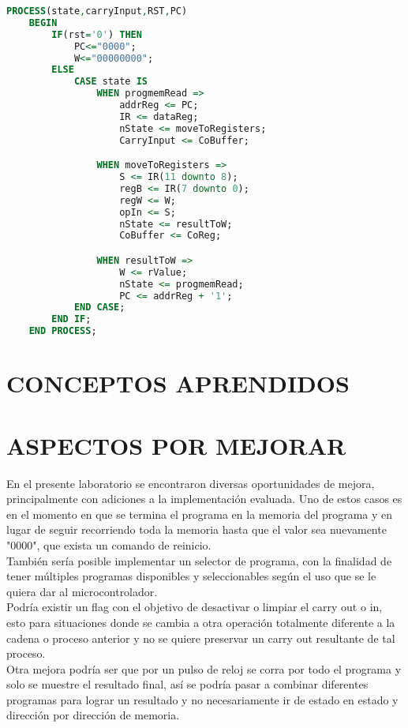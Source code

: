 \documentclass[12pt, letterpaper]{IEEEtran}
\begin{document}
\begin{lstlisting}[language=VHDL]
PROCESS(state,carryInput,RST,PC)
	BEGIN
		IF(rst='0') THEN
			PC<="0000";
			W<="00000000";
		ELSE
			CASE state IS	
				WHEN progmemRead =>
					addrReg <= PC;
					IR <= dataReg;
					nState <= moveToRegisters;
					CarryInput <= CoBuffer;

				WHEN moveToRegisters =>
					S <= IR(11 downto 8);
					regB <= IR(7 downto 0);
					regW <= W;
					opIn <= S;
					nState <= resultToW;
					CoBuffer <= CoReg;

				WHEN resultToW =>
					W <= rValue;	
					nState <= progmemRead;
					PC <= addrReg + '1';	
			END CASE;
		END IF;
	END PROCESS;
\end{lstlisting}

\section{CONCEPTOS APRENDIDOS}

\section{ASPECTOS POR MEJORAR}
\indent En el presente laboratorio se encontraron diversas oportunidades de mejora, principalmente con adiciones a la implementación evaluada. Uno de estos casos es en el momento en que se termina el programa en la memoria del programa y en lugar de seguir recorriendo toda la memoria hasta que el valor sea nuevamente "0000", que exista un comando de reinicio.\\
\indent También sería posible implementar un selector de programa, con la finalidad de tener múltiples programas disponibles y seleccionables según el uso que se le quiera dar al microcontrolador.\\
\indent Podría existir un flag con el objetivo de desactivar o limpiar el carry out o in, esto para situaciones donde se cambia a otra operación totalmente diferente a la cadena o proceso anterior y no se quiere preservar un carry out resultante de tal proceso.\\
\indent Otra mejora podría ser que por un pulso de reloj se corra por todo el programa y solo se muestre el resultado final, así se podría pasar a combinar diferentes programas para lograr un resultado y no necesariamente ir de estado en estado y dirección por dirección de memoria.\\
\end{document}
